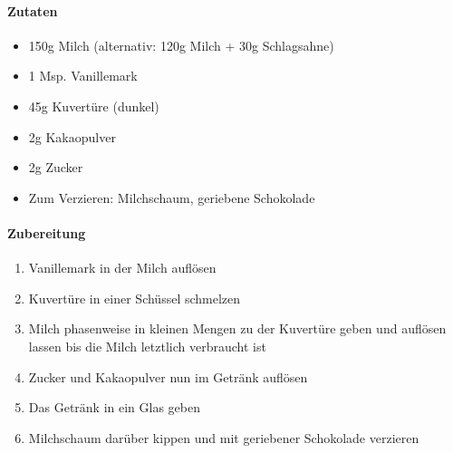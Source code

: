 \clearpage
{}

\paragraph{Zutaten}
\begin{itemize}[noitemsep]
	\item 150g Milch (alternativ: 120g Milch + 30g Schlagsahne)
	\item 1 Msp. Vanillemark
	\item 45g Kuvertüre (dunkel)
	\item 2g Kakaopulver
	\item 2g Zucker
	\item Zum Verzieren: Milchschaum, geriebene Schokolade
\end{itemize}

\paragraph{Zubereitung}
\begin{enumerate}[noitemsep]
	\item Vanillemark in der Milch auflösen
	\item Kuvertüre in einer Schüssel schmelzen 
	\item Milch phasenweise in kleinen Mengen zu der Kuvertüre geben und auflösen lassen bis die Milch letztlich verbraucht ist
	\item Zucker und Kakaopulver nun im Getränk auflösen
	\item Das Getränk in ein Glas geben
	\item Milchschaum darüber kippen und mit geriebener Schokolade verzieren
\end{enumerate}